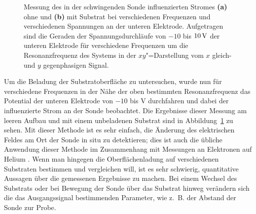 \begin{figure}[h!tb]
	\centerline{%
		}
	\caption[Vergleich einer Kelvin"=Messung mit und ohne Substrat]{Messung des in der schwingenden Sonde influenzierten Stromes {\bfseries (a)} ohne und {\bfseries (b)} mit Substrat bei verschiedenen Frequenzen und verschiedenen Spannungen an der unteren Elektrode. Aufgetragen sind die Geraden der Spannungsdurchläufe von $-10$ bis $\unit[10]{V}$ der unteren Elektrode für verschiedene Frequenzen um die Resonanzfrequenz des Systems in der $xy$"=Darstellung vom $x$ gleich- und $y$ gegenphasigen Signal.}
	\label{fig:kelvin_ref}
\end{figure}Um die Beladung der Substratoberfläche zu untersuchen, wurde nun für verschiedene Frequenzen in der Nähe der oben bestimmten Resonanzfrequenz das Potential der unteren Elektrode von $-10$ bis \unit[10]{V} durchfahren und dabei der influenzierte Strom an der Sonde beobachtet. Die Ergebnisse dieser Messung am leeren Aufbau und mit einem unbeladenen Substrat sind in Abbildung~\ref{fig:kelvin_ref} zu sehen.
Mit dieser Methode ist es sehr einfach, die Änderung des elektrischen Feldes am Ort der Sonde in situ zu detektieren; dies ist auch die übliche Anwendung dieser Methode im Zusammenhang mit Messungen an Elektronen auf Helium \cite{Wil71,Etz84,Ara99}. Wenn man hingegen die Oberflächenladung auf verschiedenen Substraten bestimmen und vergleichen will, ist es sehr schwierig, quantitative Aussagen über die gemessenen Ergebnisse zu machen. Bei einem Wechsel des Substrats oder bei Bewegung der Sonde über das Substrat hinweg verändern sich die das Ausgangssignal bestimmenden Parameter, wie z.~B. der Abstand der Sonde zur Probe.
 
